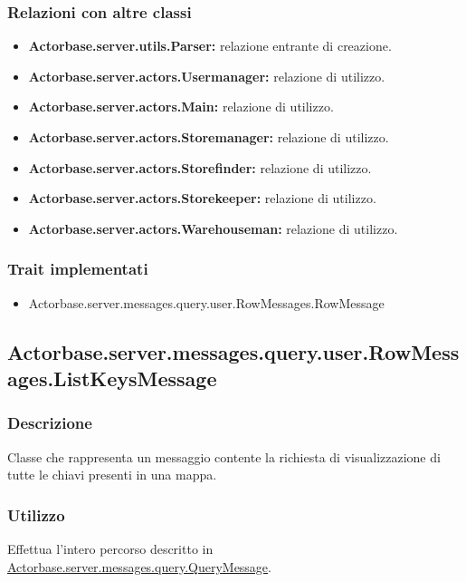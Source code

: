 \documentclass[a4paper]{article}
\begin{document}
			\subsubsection{Relazioni con altre classi}
				\begin{itemize}
					\item \textbf{Actorbase.server.utils.Parser:} relazione entrante di creazione.
					\item \textbf{Actorbase.server.actors.Usermanager:} relazione di utilizzo.
					\item \textbf{Actorbase.server.actors.Main:} relazione di utilizzo.
					\item \textbf{Actorbase.server.actors.Storemanager:} relazione di utilizzo.
					\item \textbf{Actorbase.server.actors.Storefinder:} relazione di utilizzo.
					\item \textbf{Actorbase.server.actors.Storekeeper:} relazione di utilizzo.
					\item \textbf{Actorbase.server.actors.Warehouseman:} relazione di utilizzo.
				\end{itemize}
			\subsubsection{Trait implementati}
				\begin{itemize}
					\item Actorbase.server.messages.query.user.RowMessages.RowMessage
				\end{itemize}
				
		\subsection{Actorbase.server.messages.query.user.RowMessages.ListKeysMessage}
			\subsubsection{Descrizione}
				Classe che rappresenta un messaggio contente la richiesta di visualizzazione di tutte le chiavi presenti in una mappa.
				
			\subsubsection{Utilizzo}
				Effettua l'intero percorso descritto in \hyperref[QueryMessage]{Actorbase.server.messages.query.QueryMessage}.
				
\end{document}
